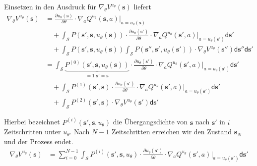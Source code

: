 \documentclass[a4paper, 12pt]{scrartcl}
\begin{document}
\begin{beweis}
    Einsetzen in den Ausdruck für $\nabla_{\theta} V^{u_\theta}(\bm{s})$ liefert
    \begin{align*}
        \nabla_{\theta} V^{u_\theta}(\bm{s})
        &=
        \frac{\partial u_\theta (\bm{s})}{\partial \theta}
        \cdot
        \nabla_a Q^{u_{\theta}}(\bm{s}, a) \Big|_{a = u_\theta (\bm{s})}
        \\
        &\quad+
        \int_{\mathcal{S}} 
        P(\bm{s}', \bm{s}, u_\theta (\bm{s})) 
        \cdot
        \frac{\partial u_\theta (\bm{s}')}{\partial \theta}
        \cdot
        \nabla_a Q^{u_{\theta}}(\bm{s}' , a) \Big|_{a = u_\theta (\bm{s}')}
        \mathsf{d}\bm{s}'
        \\
        &\quad+
        \int_{\mathcal{S}} 
        P(\bm{s}', \bm{s}, u_\theta (\bm{s}))
        \int_{\mathcal{S}}
        P(\bm{s}'', \bm{s}', u_\theta (\bm{s}')) 
        \cdot
        \nabla_\theta V^{u_\theta}(\bm{s}'')
        \mathsf{d}\bm{s}''
        \mathsf{d}\bm{s}'
        \\
        &=
        \int_{\mathcal{S}} 
        \underbrace{
            P^{(0)}(\bm{s}', \bm{s}, u_\theta (\bm{s}))
        }_{
           = 1 \; \bm{s}' = \bm{s}
        }
        \cdot
        \frac{\partial u_\theta (\bm{s}')}{\partial \theta}
        \cdot
        \nabla_a Q^{u_{\theta}}(\bm{s}' , a) \Big|_{a = u_\theta (\bm{s}')}
        \mathsf{d}\bm{s}'
        \\
        &\quad+
        \int_{\mathcal{S}} 
        P^{(1)}(\bm{s}', \bm{s}) 
        \cdot
        \frac{\partial u_\theta (\bm{s}')}{\partial \theta}
        \cdot
        \nabla_a Q^{u_{\theta}}(\bm{s}' , a) \Big|_{a = u_\theta (\bm{s}')}
        \mathsf{d}\bm{s}'
        \\
        &\quad+
        \int_{\mathcal{S}}
        P^{(2)}(\bm{s}', \bm{s}) 
        \cdot
        \nabla_\theta V^{u_\theta}(\bm{s}')
        \mathsf{d}\bm{s}'
    \end{align*}

    Hierbei bezeichnet $P^{(i)}(\bm{s}', \bm{s}, u_\theta)$ die Übergangsdichte von $\bm{s}$ 
    nach $\bm{s}'$ in $i$ Zeitschritten unter $u_\theta$. 
    Nach $N-1$ Zeitschritten erreichen wir den Zustand $\bm{s}_N$ und der Prozess endet. 
    \begin{align*}
        \nabla_{\theta} V^{u_\theta}(\bm{s})
        &=
        \sum_{i=0}^{N-1}
        \int_{\mathcal{S}} 
        P^{(i)}(\bm{s}', \bm{s}, u_\theta) 
        \cdot
        \frac{\partial u_\theta (\bm{s}')}{\partial \theta}
        \cdot
        \nabla_a Q^{u_{\theta}}(\bm{s}', a) \Big|_{a = u_\theta (\bm{s}')}
        \mathsf{d}\bm{s}'
    \end{align*}


\end{beweis}
\end{document}
